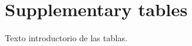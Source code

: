 %
%
%
%
%

\onecolumn
\section{Supplementary tables}
\label{app:tables}

Texto introductorio de las tablas.


\FloatBarrier
\twocolumn
